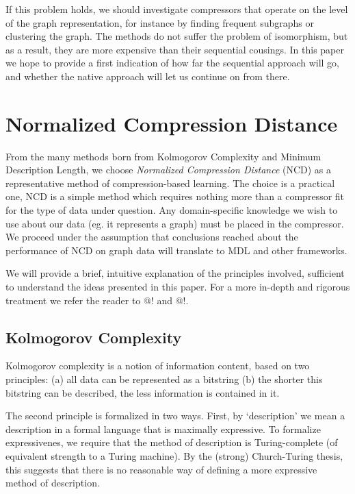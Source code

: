 \documentclass[10pt,a4paper,oneside]{article}
\begin{document}
If this problem holds, we should investigate compressors that operate on the level of the graph representation, for instance by finding frequent subgraphs or clustering the graph. The methods do not suffer the problem of isomorphism, but as a result, they are more expensive than their sequential cousings. In this paper we hope to provide a first indication of how far the sequential approach will go, and whether the native approach will let us continue on from there.

\section*{Normalized Compression Distance}

From the many methods born from Kolmogorov Complexity and Minimum Description Length, we choose \emph{Normalized Compression Distance} (NCD) as a representative method of compression-based learning. The choice is a practical one, NCD is a simple method which requires nothing more than a compressor fit for the type of data under question. Any domain-specific knowledge we wish to use about our data (eg. it represents a graph) must be placed in the compressor. We proceed under the assumption that conclusions reached about the performance of NCD on graph data will translate to MDL and other frameworks.

We will provide a brief, intuitive explanation of the principles involved, sufficient to understand the ideas presented in this paper. For a more in-depth and rigorous treatment we refer the reader to @! and @!.

\subsection*{Kolmogorov Complexity}

Kolmogorov complexity is a notion of information content, based on two principles: (a) all data can be represented as a bitstring (b) the shorter this bitstring can be described, the less information is contained in it.

The second principle is formalized in two ways. First, by `description' we mean a description in a formal language that is maximally expressive. To formalize expressivenes, we require that the method of description is Turing-complete (of equivalent strength to a Turing machine). By the (strong) Church-Turing thesis, this suggests that there is no reasonable way of defining a more expressive method of description.
\end{document}
